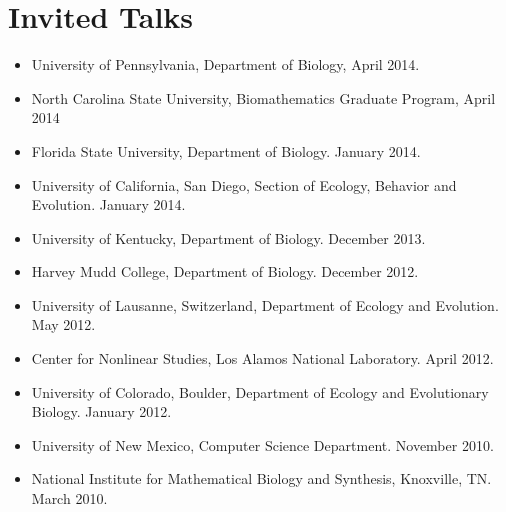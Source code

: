 \documentclass[11pt]{article}
\begin{document}
    



  \pagestyle{fancy}
  \section{Invited Talks}
  \begin{itemize}
  \item University of Pennsylvania, Department of Biology, April 2014.
  \item North Carolina State University, Biomathematics Graduate Program, April 2014
  \item Florida State University, Department of Biology.  January 2014.
  \item University of California, San Diego, Section of Ecology, Behavior and Evolution.  January 2014.
  \item University of Kentucky, Department of Biology. December 2013.
  \item Harvey Mudd College, Department of Biology. December 2012.
  \item %
    University of Lausanne, Switzerland, Department of Ecology and Evolution. May 2012.
  \item %
    Center for Nonlinear Studies, Los Alamos National Laboratory. April 2012.
  \item %
    University of Colorado, Boulder, Department of Ecology and Evolutionary Biology. January 2012.
  \item %
    University of New Mexico, Computer Science Department. November 2010.
  \item %
    National Institute for Mathematical Biology and Synthesis, Knoxville, TN. March 2010.
  \end{itemize}
  
\end{document}
